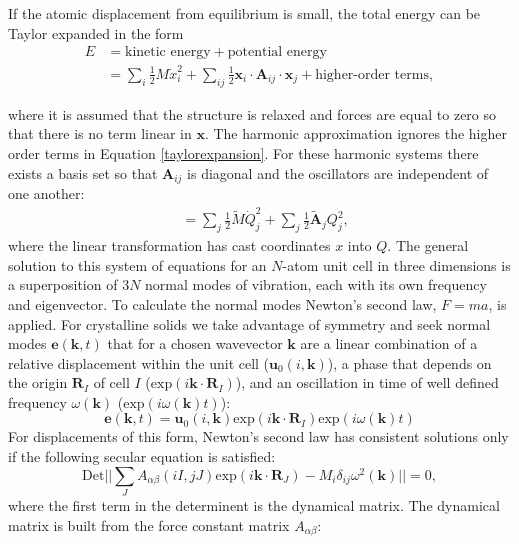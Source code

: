 If the atomic displacement from equilibrium is small, the total energy can be Taylor expanded in the form\autocite{Hayes1985} 
\begin{align} \label{taylorexpansion}
E&=\textrm{kinetic energy}+\textrm{potential energy} \\
&=\sum_i\frac{1}{2}M\dot{x}_i^2+\sum_{ij}\frac{1}{2}\textbf{x}_i\cdot\textbf{A}_{ij}\cdot\textbf{x}_j+\textrm{higher-order terms},
\end{align}

where it is assumed that the structure is relaxed and forces are equal to zero so that there is no term linear in $\textbf{x}$. The harmonic approximation ignores the higher order terms in Equation \ref{taylorexpansion}. For these harmonic systems there exists a basis set so that $\textbf{A}_{ij}$ is diagonal and the oscillators are independent of one another:
\begin{align} \label{independentoscillators}
&=\sum_j\frac{1}{2}\tilde{M}\dot{Q}_j^2+\sum_{j}\frac{1}{2}\tilde{\textbf{A}}_{j}Q_j^2,
\end{align}
where the linear transformation has cast coordinates $x$ into $Q$.
The general solution to this system of equations for an $N$-atom unit cell in three dimensions is a superposition of $3N$ normal modes of vibration, each with its own frequency and eigenvector.
To calculate the normal modes Newton's second law, $F=ma$, is applied. For crystalline solids we take advantage of symmetry and seek normal modes $\textbf{e}(\textbf{k},t)$ that for a chosen wavevector $\textbf{k}$ are a linear combination of a relative displacement within the unit cell ($\textbf{u}_0(i,\textbf{k})$), a phase that depends on the origin $\textbf{R}_I$ of cell $I$ ($\textrm{exp}(i\textbf{k}\cdot \textbf{R}_I)$), and an oscillation in time of well defined frequency $\omega(\textbf{k})$ ($\textrm{exp}(i\omega(\textbf{k})t)$):
\begin{equation} \label{normalmodes}
\textbf{e}(\textbf{k},t) = \textbf{u}_0(i,\textbf{k})\textrm{exp}(i\textbf{k}\cdot\textbf{R}_I)\textrm{exp}(i\omega(\textbf{k})t)
\end{equation}
For displacements of this form, Newton's second law has consistent solutions only if the following secular equation is satisfied:
\begin{equation}
\textrm{Det}||\sum_J A_{\alpha\beta}(iI,jJ)\textrm{exp}(i\textbf{k}\cdot\textbf{R}_J)-M_i\delta_{ij}\omega^2(\textbf{k})||=0,
\end{equation}
where the first term in the determinent is the dynamical matrix. The dynamical matrix is built from the force constant matrix $A_{\alpha\beta}$:
